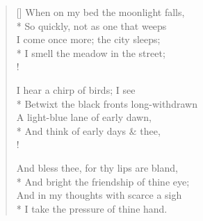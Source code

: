 \documentclass[MAIN]{subfiles}
\begin{document}
\settowidth{\versewidth}{Doors, where my heart was used to beat}
\begin{verse}[\versewidth]
When on my bed the moonlight falls,\\*
\vin So quickly, not as one that weeps\\
\vin I come once more; the city sleeps;\\*
I smell the meadow in the street;\\!

I hear a chirp of birds; I see\\*
\vin Betwixt the black fronts long-withdrawn\\
\vin A light-blue lane of early dawn,\\*
And think of early days \& thee,\\!

And bless thee, for thy lips are bland,\\*
\vin And bright the friendship of thine eye;\\
\vin And in my thoughts with scarce a sigh\\*
I take the pressure of thine hand.
\end{verse}
\end{document}
